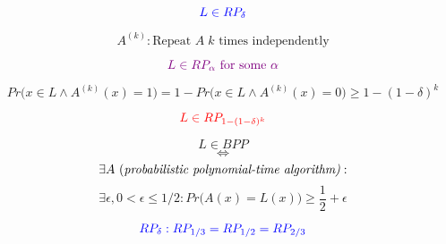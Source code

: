 \begin{frame}
  \[
	\textcolor{blue}{L \in RP_{\delta}}
  \]

  \pause
  \[
	A^{(k)}: \text{Repeat } A\; k \text{ times independently}
  \]

  \pause
  \begin{center}
  \end{center}

  \pause
  \[
	\textcolor{violet}{L \in RP_{\alpha} \text{ for some } \alpha}
  \]

  \pause
  \[
	Pr\Big(x \in L \land A^{(k)}(x) = 1\Big) = 1 - Pr\Big(x \in L \land A^{(k)}(x) = 0\Big) \ge 1- (1-\delta)^{k}
  \]

  \pause
  \[
	\textcolor{red}{L \in RP_{1-(1-\delta)^{k}}}
  \]
\end{frame}

\begin{frame}
  \begin{definition}
	\[
	  L \in BPP
	\]
	\[
	  \iff
	\]
	\[
	  \exists A \text{ (\it probabilistic polynomial-time algorithm)}: 
	\]
	\[
	  \exists \epsilon, 0 < \epsilon \le 1/2: Pr\Big(A(x) = L(x)\Big) \ge \frac{1}{2} + \epsilon
	\]
  \end{definition}

  \pause
  \begin{center}
	 \pause
	 \pause
	\[
	  \textcolor{blue}{RP_{\delta}: RP_{1/3} = RP_{1/2} = RP_{2/3}}
	\]
  \end{center}
\end{frame}

\begin{frame}
\end{frame}

\begin{frame}
\end{frame}

\begin{frame}
\end{frame}

\begin{frame}
\end{frame}
